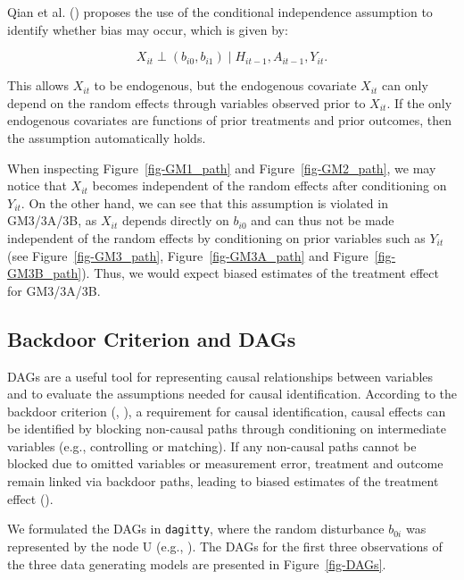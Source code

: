 \documentclass[
  12pt,
  a4paper,
]{article}
\begin{document}
Qian et al. () proposes the use of the
conditional independence assumption to identify whether bias may occur,
which is given by:

\[ X_{it} \perp (b_{i0}, b_{i1}) \mid H_{it-1}, A_{it-1}, Y_{it}. \]

This allows \(X_{it}\) to be endogenous, but the endogenous covariate
\(X_{it}\) can only depend on the random effects through variables
observed prior to \(X_{it}\). If the only endogenous covariates are
functions of prior treatments and prior outcomes, then the assumption
automatically holds.

When inspecting Figure~\ref{fig-GM1_path} and Figure~\ref{fig-GM2_path},
we may notice that \(X_{it}\) becomes independent of the random effects
after conditioning on \(Y_{it}\). On the other hand, we can see that
this assumption is violated in GM3/3A/3B, as \(X_{it}\) depends directly
on \(b_{i0}\) and can thus not be made independent of the random effects
by conditioning on prior variables such as \(Y_{it}\) (see
Figure~\ref{fig-GM3_path}, Figure~\ref{fig-GM3A_path} and
Figure~\ref{fig-GM3B_path}). Thus, we would expect biased estimates of
the treatment effect for GM3/3A/3B.

\subsection{Backdoor Criterion and
DAGs}\label{backdoor-criterion-and-dags}

DAGs are a useful tool for representing causal relationships between
variables and to evaluate the assumptions needed for causal
identification. According to the backdoor criterion
(, ),
a requirement for causal identification, causal effects can be
identified by blocking non-causal paths through conditioning on
intermediate variables (e.g., controlling or matching). If any
non-causal paths cannot be blocked due to omitted variables or
measurement error, treatment and outcome remain linked via backdoor
paths, leading to biased estimates of the treatment effect
().

We formulated the DAGs in \texttt{dagitty}, where the random disturbance
\(b_{0i}\) was represented by the node U (e.g.,
). The DAGs for the first
three observations of the three data generating models are presented in
Figure~\ref{fig-DAGs}.
\end{document}
